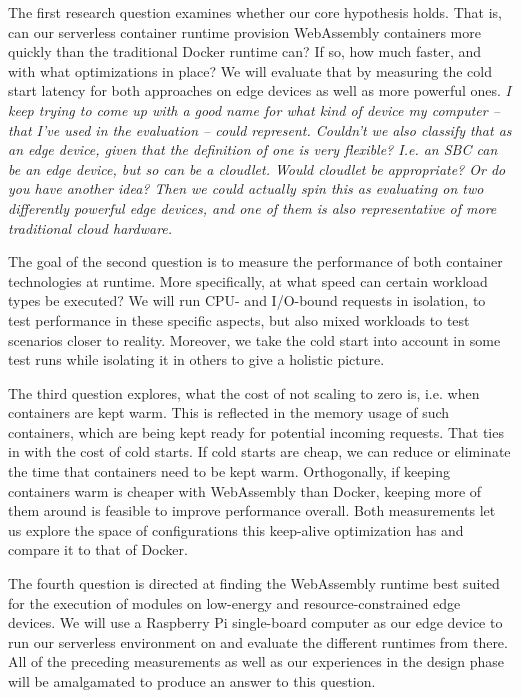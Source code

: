 The first research question examines whether our core hypothesis holds. That is, can our serverless container runtime provision WebAssembly containers more quickly than the traditional Docker runtime can? If so, how much faster, and with what optimizations in place? We will evaluate that by measuring the cold start latency for both approaches on edge devices as well as more powerful ones.  \textit{I keep trying to come up with a good name for what kind of device my computer -- that I've used in the evaluation -- could represent. Couldn't we also classify that as an edge device, given that the definition of one is very flexible? I.e. an SBC can be an edge device, but so can be a cloudlet. Would cloudlet be appropriate? Or do you have another idea? Then we could actually spin this as evaluating on two differently powerful edge devices, and one of them is also representative of more traditional cloud hardware.}

The goal of the second question is to measure the performance of both container technologies at runtime. More specifically, at what speed can certain workload types be executed? We will run CPU- and I/O-bound requests in isolation, to test performance in these specific aspects, but also mixed workloads to test scenarios closer to reality. Moreover, we take the cold start into account in some test runs while isolating it in others to give a holistic picture.

The third question explores, what the cost of not scaling to zero is, i.e. when containers are kept warm. This is reflected in the memory usage of such containers, which are being kept ready for potential incoming requests. That ties in with the cost of cold starts. If cold starts are cheap, we can reduce or eliminate the time that containers need to be kept warm. Orthogonally, if keeping containers warm is cheaper with WebAssembly than Docker, keeping more of them around is feasible to improve performance overall. Both measurements let us explore the space of configurations this keep-alive optimization has and compare it to that of Docker.

The fourth question is directed at finding the WebAssembly runtime best suited for the execution of modules on low-energy and resource-constrained edge devices. We will use a Raspberry Pi single-board computer as our edge device to run our serverless environment on and evaluate the different runtimes from there. All of the preceding measurements as well as our experiences in the design phase will be amalgamated to produce an answer to this question.

